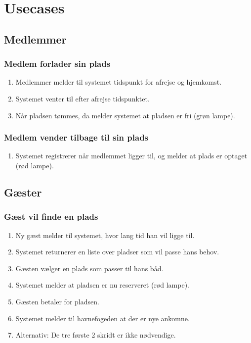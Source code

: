 \section{Usecases}

\subsection{Medlemmer}

    \subsubsection{Medlem forlader sin plads}

    \begin{enumerate}
      \item Medlemmer melder til systemet tidspunkt for afrejse og hjemkomst.
      \item Systemet venter til efter afrejse tidspunktet.
      \item Når pladsen tømmes, da melder systemet at pladsen er fri (grøn lampe).
    \end{enumerate}

        \subsubsection{Medlem vender tilbage til sin plads}

    \begin{enumerate}
      \item Systemet registrerer når medlemmet ligger til, og melder at plads er optaget (rød lampe).
    \end{enumerate}

\subsection{Gæster}


\subsubsection{Gæst vil finde en plads}

    \begin{enumerate}
      \item Ny gæst melder til systemet, hvor lang tid han vil ligge til.
      \item Systemet returnerer en liste over pladser som vil passe hans behov.
      \item Gæsten vælger en plads som passer til hans båd.
      \item Systemet melder at pladsen er nu reserveret (rød lampe).
      \item Gæsten betaler for pladsen.
      \item Systemet melder til havnefogeden at der er nye ankomne.
      \item Alternativ: De tre første 2 skridt er ikke nødvendige.
    \end{enumerate}








